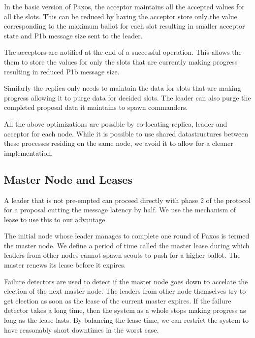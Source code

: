 In the basic version of Paxos, the acceptor maintains all the accepted values
for all the slots. This can be reduced by having the acceptor store only the 
value corresponding to the maximum ballot for each slot resulting in smaller
acceptor state and P1b message size sent to the leader.

The acceptors are notified at the end of a successful operation. This allows
the them to store the values for only the slots that are currently making
progress resulting in reduced P1b message size.

Similarly the replica only needs to maintain the data for slots that are
making progress allowing it to purge data for decided slots. The leader can
also purge the completed proposal data it maintains to spawn commanders.

All the above optimizations are possible by co-locating replica, leader
and acceptor for each node. While it is possible to use shared datastructures
between these processes residing on the same node, we avoid it to allow for
a cleaner implementation.

\subsection{Master Node and Leases}

A leader that is not pre-empted can proceed directly with phase 2 of the
protocol for a proposal cutting the message latency by half. We use the
mechanism of lease to use this to our advantage.

The initial node whose leader manages to complete one round of Paxos is
termed the master node. We define a period of time called the master lease 
during which leaders from other nodes cannot spawn scouts to push for a
higher ballot. The master renews its lease before it expires.

Failure detectors%
are used to detect if the master node goes down to accelate the election
of the next master node. The leaders from other node themselves try to
get election as soon as the lease of the current master expires. If the 
failure detector takes a long time, then the system as a whole
stops making progress as long as the lease lasts. By balancing the lease
time, we can restrict the system to have reasonably short downtimes in
the worst case.

